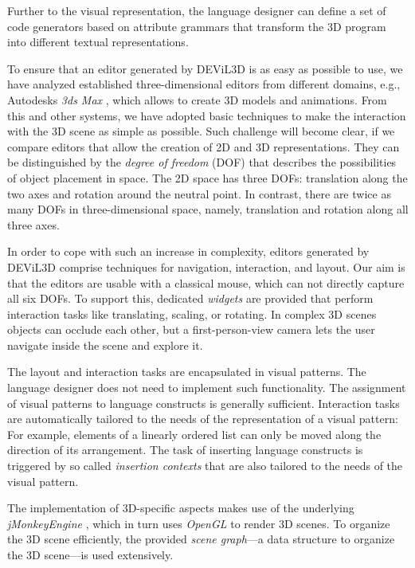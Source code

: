 \documentclass[a4paper]{article}
\newcommand{\dev}{DEViL3D\xspace}
\begin{document}
Further to the visual representation, the language designer can define a set of code generators based on attribute grammars that transform the 3D program into different textual representations.



To ensure that an editor generated by \dev is as easy as possible to use, we have analyzed established three-dimensional editors from different domains, e.g., Autodesks \emph{3ds Max} \cite{3dsmax}, which allows to create 3D models and animations. From this and other systems, we have adopted basic techniques to make the interaction with the 3D scene as simple as possible. Such challenge will become clear, if we compare editors that allow the creation of 2D and 3D representations. They can be distinguished by the \emph{degree of freedom} (DOF) that describes the possibilities of object placement in space. The 2D space has three DOFs: translation along the two axes and rotation around the neutral point. In contrast, there are twice as many DOFs in three-dimensional space, namely, translation and rotation along all three axes.

In order to cope with such an increase in complexity, editors generated by \dev comprise techniques for navigation, interaction, and layout. Our aim is that the editors are usable with a classical mouse, which can not directly capture all six DOFs. To support this, dedicated \emph{widgets} are provided that perform interaction tasks like translating, scaling, or rotating. In complex 3D scenes objects can occlude each other, but a first-person-view camera lets the user navigate inside the scene and explore it.

The layout and interaction tasks are encapsulated in visual patterns. The language designer does not need to implement such functionality. The assignment of visual patterns to language constructs is generally sufficient. Interaction tasks are automatically tailored to the needs of the representation of a visual pattern: For example, elements of a linearly ordered list can only be moved along the direction of its arrangement. The task of inserting language constructs is triggered by so called \emph{insertion contexts} that are also tailored to the needs of the visual pattern.

The implementation of 3D-specific aspects makes use of the underlying \emph{jMonkeyEngine} \cite{jme}, which in turn uses \emph{OpenGL} to render 3D scenes. To organize the 3D scene efficiently, the provided \emph{scene graph}---a data structure to organize the 3D scene---is used extensively.
\end{document}

